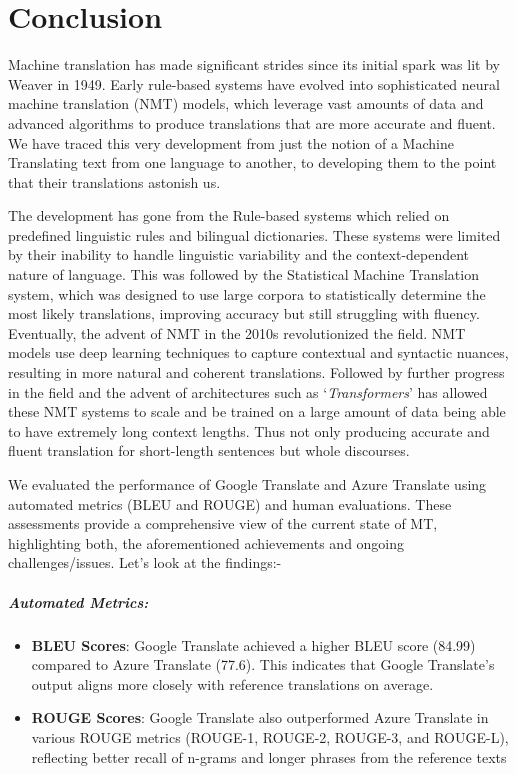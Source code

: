 \chapter{Conclusion}

Machine translation has made significant strides since its initial spark was lit by Weaver in 1949. Early rule-based systems have evolved into sophisticated neural machine translation (NMT) models, which leverage vast amounts of data and advanced algorithms to produce translations that are more accurate and fluent. We have traced this very development from just the notion of a Machine Translating text from one language to another, to developing them to the point that their translations astonish us.

The development has gone from the Rule-based systems which relied on predefined linguistic rules and bilingual dictionaries. These systems were limited by their inability to handle linguistic variability and the context-dependent nature of language. This was followed by the Statistical Machine Translation system, which was designed to use large corpora to statistically determine the most likely translations, improving accuracy but still struggling with fluency. Eventually, the advent of NMT in the 2010s revolutionized the field. NMT models use deep learning techniques to capture contextual and syntactic nuances, resulting in more natural and coherent translations. Followed by further progress in the field and the advent of architectures such as `\textit{Transformers}' has allowed these NMT systems to scale and be trained on a large amount of data being able to have extremely long context lengths. Thus not only producing accurate and fluent translation for short-length sentences but whole discourses.

We evaluated the performance of Google Translate and Azure Translate using automated metrics (BLEU and ROUGE) and human evaluations. These assessments provide a comprehensive view of the current state of MT, highlighting both, the aforementioned achievements and ongoing challenges/issues. Let's look at the findings:-

\paragraph{Automated Metrics:}
\begin{itemize}
    \item \textbf{BLEU Scores}: Google Translate achieved a higher BLEU score (84.99) compared to Azure Translate (77.6). This indicates that Google Translate's output aligns more closely with reference translations on average.
    \item \textbf{ROUGE Scores}: Google Translate also outperformed Azure Translate in various ROUGE metrics (ROUGE-1, ROUGE-2, ROUGE-3, and ROUGE-L), reflecting better recall of n-grams and longer phrases from the reference texts
\end{itemize}

